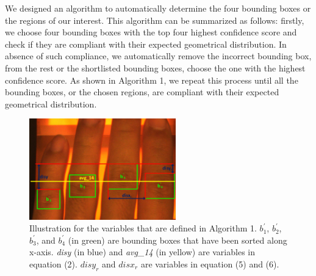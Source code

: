 We designed an algorithm to automatically determine the four bounding boxes or the regions of our interest. This algorithm can be summarized as follows: firstly, we choose four bounding boxes with the top four highest confidence score and check if they are compliant with their expected geometrical distribution. In absence of such compliance, we automatically remove the incorrect bounding box, from the rest or the shortlisted bounding boxes, choose the one with the highest confidence score. As shown in Algorithm 1, we repeat this process until all the bounding boxes, or the chosen regions, are compliant with their expected geometrical distribution.

\begin{figure}[!ht]
    \centering
    \includegraphics[width=2.5in]{Figures/select-algorithm.png}
    \caption{Illustration for the variables that are defined in Algorithm 1. $b_1^{'}$, $b_2^{'}$, $b_3^{'}$, and $b_4^{'}$ (in green) are bounding boxes that have been sorted along x-axis. \textit{disy} (in blue) and \textit{avg\_14} (in yellow) are variables in equation (2). $disy_r$ and $disx_r$ are variables in equation (5) and (6).}
    \label{select-algorithm}
\end{figure}



